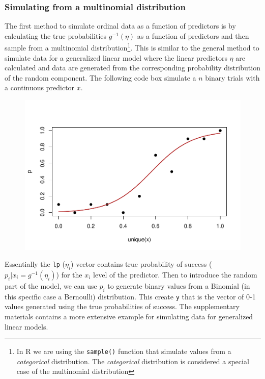 \documentclass[
  man,floatsintext]{apa6}
\begin{document}
\subsubsection{Simulating from a multinomial distribution}\label{simulating-from-a-multinomial-distribution}

The first method to simulate ordinal data as a function of predictors is by calculating the true probabilities \(g^{-1}(\eta)\) as a function of predictors and then sample from a multinomial distribution\footnote{In R we are using the \texttt{sample()} function that simulate values from a \emph{categorical} distribution. The \emph{categorical} distribution is considered a special case of the multinomial distribution}. This is similar to the general method to simulate data for a generalized linear model where the linear predictors \(\eta\) are calculated and data are generated from the corresponding probability distribution of the random component. The following code box simulate a \(n\) binary trials with a continuous predictor \(x\).

\scriptsize

\begin{figure}

{\centering \includegraphics{paper-new_files/figure-latex/unnamed-chunk-4-1} 

}

\caption{ }\label{fig:unnamed-chunk-4}
\end{figure}

\normalsize

Essentially the \texttt{lp} (\(\eta_i\)) vector contains true probability of success (\(p_i|x_i = g^{-1}(\eta_i)\)) for the \(x_i\) level of the predictor. Then to introduce the random part of the model, we can use \(p_i\) to generate binary values from a Binomial (in this specific case a Bernoulli) distribution. This create \texttt{y} that is the vector of 0-1 values generated using the true probabilities of success. The supplementary materials contains a more extensive example for simulating data for generalized linear models.
\end{document}
